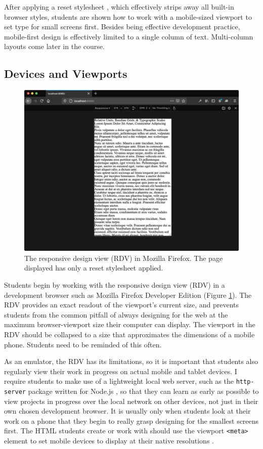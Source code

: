 \documentclass[sigplan,screen]{acmart}
\begin{document}
 After applying a reset stylesheet \cite{em:rc}, which effectively strips away all built-in browser styles, students are shown how to work with a mobile-sized viewport to set type for small screens first. Besides being effective development practice, mobile-first design is effectively limited to a single column of text. Multi-column layouts come later in the course.

\subsection{Devices and Viewports}

\begin{figure}
  \includegraphics[width=\linewidth]{rdv}
  \caption{The responsive design view (RDV) in Mozilla Firefox. The  page displayed has only a reset stylesheet applied.}
  \label{fig:rdv}
\end{figure}

Students begin by working with the responsive design view (RDV) in a development browser such as Mozilla Firefox Developer Edition (Figure \ref{fig:rdv}). The RDV provides an exact readout of the viewport's current size, and prevents students from the common pitfall of always designing for the web at the maximum browser-viewport size their computer can display. The viewport in the RDV should be collapsed to a size that approximates the dimensions of a mobile phone. Students need to be reminded of this often.

As an emulator, the RDV has its limitations, so it is important that students also regularly view their work in progress on actual mobile and tablet devices. I require students to make use of a lightweight local web server, such as the \verb|http-server| package written for Node.js \cite{npm:http}, so that they can learn as early as possible to view projects in progress over the local network on other devices, not just in their own chosen development browser. It is usually only when students look at their work on a phone that they begin to really grasp designing for the smallest screens first. The HTML students create or work with should use the viewport \verb|<meta>| element to set mobile devices to display at their native resolutions \cite{mdn:mvp}.
\end{document}
